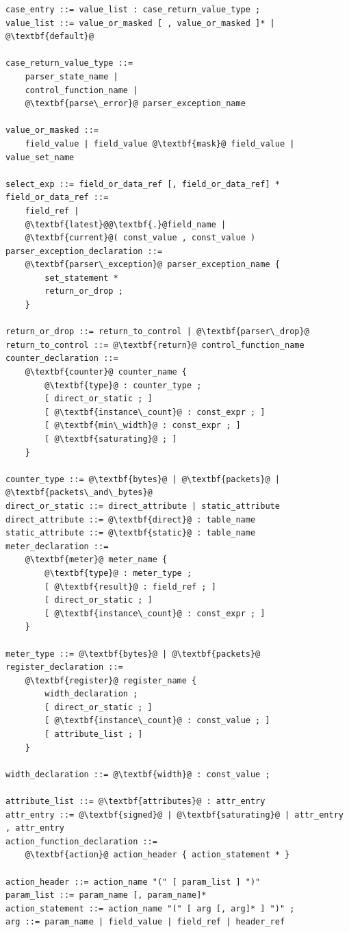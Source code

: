 \documentclass[12pt]{article}
\begin{document}
\begin{lstlisting}[frame=single,backgroundcolor=\color{bnfgreen},escapechar=\@]
case_entry ::= value_list : case_return_value_type ;
value_list ::= value_or_masked [ , value_or_masked ]* | @\textbf{default}@

case_return_value_type ::= 
    parser_state_name | 
    control_function_name | 
    @\textbf{parse\_error}@ parser_exception_name

value_or_masked ::=
    field_value | field_value @\textbf{mask}@ field_value | value_set_name

select_exp ::= field_or_data_ref [, field_or_data_ref] * 
field_or_data_ref ::=
    field_ref |
    @\textbf{latest}@@\textbf{.}@field_name |
    @\textbf{current}@( const_value , const_value )
parser_exception_declaration ::=
    @\textbf{parser\_exception}@ parser_exception_name {
        set_statement *
        return_or_drop ;
    }

return_or_drop ::= return_to_control | @\textbf{parser\_drop}@
return_to_control ::= @\textbf{return}@ control_function_name
counter_declaration ::=
    @\textbf{counter}@ counter_name { 
        @\textbf{type}@ : counter_type ;
        [ direct_or_static ; ]
        [ @\textbf{instance\_count}@ : const_expr ; ]
        [ @\textbf{min\_width}@ : const_expr ; ]
        [ @\textbf{saturating}@ ; ]
    }

counter_type ::= @\textbf{bytes}@ | @\textbf{packets}@ | @\textbf{packets\_and\_bytes}@
direct_or_static ::= direct_attribute | static_attribute
direct_attribute ::= @\textbf{direct}@ : table_name
static_attribute ::= @\textbf{static}@ : table_name
meter_declaration ::= 
    @\textbf{meter}@ meter_name {
        @\textbf{type}@ : meter_type ;
        [ @\textbf{result}@ : field_ref ; ]
        [ direct_or_static ; ]
        [ @\textbf{instance\_count}@ : const_expr ; ]
    }

meter_type ::= @\textbf{bytes}@ | @\textbf{packets}@
register_declaration ::= 
    @\textbf{register}@ register_name {
        width_declaration ;
        [ direct_or_static ; ]
        [ @\textbf{instance\_count}@ : const_value ; ]
        [ attribute_list ; ]
    }

width_declaration ::= @\textbf{width}@ : const_value ;

attribute_list ::= @\textbf{attributes}@ : attr_entry
attr_entry ::= @\textbf{signed}@ | @\textbf{saturating}@ | attr_entry , attr_entry
action_function_declaration ::=
    @\textbf{action}@ action_header { action_statement * }

action_header ::= action_name "(" [ param_list ] ")"
param_list ::= param_name [, param_name]*
action_statement ::= action_name "(" [ arg [, arg]* ] ")" ;
arg ::= param_name | field_value | field_ref | header_ref


\end{lstlisting}
\end{document}
